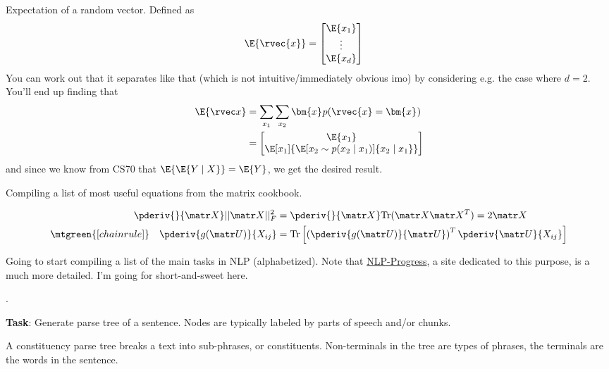 \documentclass[11pt]{article}
\renewcommand\vec[2][]{\bm{#2}_{#1}}
\newcommand\myspace[1][]{\vspace{#1\bigskipamount}}
\newcommand\p{\Needspace{10\baselineskip} \noindent}
\begin{document}
\begin{compactitem}
	\item Expectation of a random vector. Defined as
	\begin{align}
		\E{\rvec{x}} &= \begin{bmatrix}
			\E{x_1} \\ \vdots \\ \E{x_d}
		\end{bmatrix}
	\end{align}
	You can work out that it separates like that (which is not intuitive/immediately obvious imo) by considering e.g. the case where $d=2$. You'll end up finding that
	\begin{align}
		\E{\rvec x}
			&= \sum_{x_1} \sum_{x_2} \vec x p(\rvec{x} = \vec{x}) \\
			&= \begin{bmatrix}
				\E{x_1} \\ \E[x_1]{\E[x_2 \sim p(x_2 \mid x_1)]{x_2 \mid x_1}  }
			\end{bmatrix}
	\end{align}
	and since we know from CS70 that $\E{\E{Y \mid X}} = \E{Y}$, we get the desired result.
\end{compactitem}



Compiling a list of most useful equations from the matrix cookbook. 

\begin{align}
	\pderiv{}{\matr X} ||\matr X||_F^2 
		&= \pderiv{}{\matr X} \text{Tr}(\matr X \matr X^T) = 2 \matr X \\
	\mtgreen{[chain rule]}\quad
	\pderiv{g(\matr U)}{X_{ij}}
		&= \text{Tr}\left[  \left(  \pderiv{g(\matr U)}{\matr U} \right)^T \pderiv{\matr U}{X_{ij}} \right]
\end{align}




Going to start compiling a list of the main tasks in NLP (alphabetized). Note that \href{https://nlpprogress.com/}{NLP-Progress}, a site dedicated to this purpose, is a much more detailed. I'm going for short-and-sweet here.

\myspace
\p {}.
\begin{compactitem}
	\item \textbf{Task}: Generate parse tree of a sentence. Nodes are typically labeled by parts of speech and/or chunks. 
	\begin{compactitem}
		\item A constituency parse tree breaks a text into sub-phrases, or constituents. Non-terminals in the tree are types of phrases, the terminals are the words in the sentence. 
	\end{compactitem}
\end{compactitem}
\end{document}
